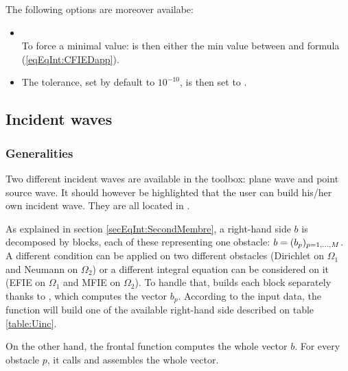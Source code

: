 The following options are moreover availabe:
\begin{itemize}
\item {}\\
To force a minimal value:  is then either the min value between  and formula (\ref{eqEqInt:CFIEDapp}). 
\item{}
The tolerance, set by default to $10^{-10}$, is then set to .
\end{itemize}

\subsection{Incident waves}

\subsubsection{Generalities}
\label{secFun:PlaneWave}
\label{secFun:DnPlaneWave}
\label{secFun:PointSource}
\label{secFun:DnPointSource}
\label{secFun:PlaneWavePrecond}
\label{secFun:DnPlaneWavePrecond}
\label{secFun:BlockPlaneWave}
\label{secFun:BlockDnPlaneWave}
\label{secFun:BlockPointSource}
\label{secFun:BlockDnPointSource}
\label{secFun:BlockPlaneWavePrecond}
\label{secFun:BlockDnPlaneWavePrecond}

Two different incident waves are available in the \mudiff toolbox: plane wave and point source wave. It should however be highlighted that the user can build his/her own incident wave. They are all located in .

As explained in section \ref{secEqInt:SecondMembre}, a right-hand side $b$ is decomposed by blocks, each of these representing one obstacle: $b= (b_p)_{p=1,\ldots,M}$. A different condition can be applied on two different obstacles (\eg Dirichlet on $\Omega_1$ and Neumann on $\Omega_2$) or a different integral equation can be considered on it (\eg EFIE on $\Omega_1$ and MFIE on $\Omega_2$). To handle that, \mudiff builds each block separately thanks to \BlockIncidentWave, which computes the vector $b_p$. According to the input data, the function will build one of the available right-hand side described on table \ref{table:Uinc}.

On the other hand, the frontal function \IncidentWave computes the whole vector $b$. For every obstacle $p$, it calls \BlockIncidentWave and assembles the whole vector. 

